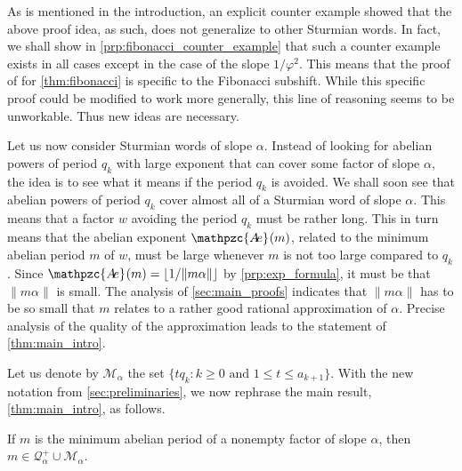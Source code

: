 \documentclass[a4paper,fleqn]{article}
\providecommand{\norm}[1]{\lVert#1\rVert}
\providecommand{\floor}[1]{\lfloor#1\rfloor}
\newcommand{\abexp}[2][]{\mathpzc{A\mkern-3mu e}_{#1}(#2)}
\newcommand{\qkl}[1]{\mathcal{Q}^+_{#1}}
\begin{document}
  As is mentioned in the introduction, an explicit counter example showed that the above proof idea, as such, does not
  generalize to other Sturmian words. In fact, we shall show in \autoref{prp:fibonacci_counter_example} that such a
  counter example exists in all cases except in the case of the slope $1/\varphi^2$. This means that the proof of
  \cite{2016:abelian_powers_and_repetitions_in_sturmian_words} for \autoref{thm:fibonacci} is specific to the Fibonacci
  subshift. While this specific proof could be modified to work more generally, this line of reasoning seems to be
  unworkable. Thus new ideas are necessary.

  Let us now consider Sturmian words of slope $\alpha$. Instead of looking for abelian powers of period $q_k$ with
  large exponent that can cover some factor of slope $\alpha$, the idea is to see what it means if the period $q_k$ is
  avoided. We shall soon see that abelian powers of period $q_k$ cover almost all of a Sturmian word of slope $\alpha$.
  This means that a factor $w$ avoiding the period $q_k$ must be rather long. This in turn means that the abelian
  exponent $\abexp{m}$, related to the minimum abelian period $m$ of $w$, must be large whenever $m$ is not too large
  compared to $q_k$. Since $\abexp{m} = \floor{1/\norm{m\alpha}}$ by \autoref{prp:exp_formula}, it must be that
  $\norm{m\alpha}$ is small. The analysis of \autoref{sec:main_proofs} indicates that $\norm{m\alpha}$ has to be so
  small that $m$ relates to a rather good rational approximation of $\alpha$. Precise analysis of the quality of the
  approximation leads to the statement of \autoref{thm:main_intro}.

  Let us denote by $\mathcal{M}_\alpha$ the set $\{tq_k : \text{$k \geq 0$ and $1 \leq t \leq a_{k+1}$}\}$. With the
  new notation from \autoref{sec:preliminaries}, we now rephrase the main result, \autoref{thm:main_intro}, as follows.
  
  \begin{theorem}\label{thm:main}
    If $m$ is the minimum abelian period of a nonempty factor of slope $\alpha$, then
    $m \in \qkl{\alpha} \cup \mathcal{M}_\alpha$.
  \end{theorem}
\end{document}
